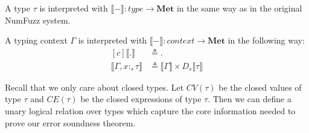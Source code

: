 \begin{definition}
  A type $\tau$ is interpreted with $\llbracket - \rrbracket : \textit{type} \to
  \textbf{Met}$ in the same way as in the original NumFuzz system.
\end{definition}


\begin{definition}
  A typing context $\Gamma$ is interpreted with $\llbracket - \rrbracket :
  \textit{context} \to \textbf{Met}$ in the following way:
  \begin{equation}
  \begin{aligned}[c]
    \llbracket . \rrbracket &\triangleq . \\
    \llbracket \Gamma, x :_s \tau \rrbracket &\triangleq \llbracket \Gamma \rrbracket
      \times D_s \llbracket \tau \rrbracket
  \end{aligned}
  \end{equation}
\end{definition}

Recall that we only care about closed types.
Let $CV(\tau)$ be the closed values of type $\tau$ and $CE(\tau)$ be the closed
expressions of type $\tau$. Then we can define a unary logical relation over types which
capture the core information needed to prove our error soundness theorem.

